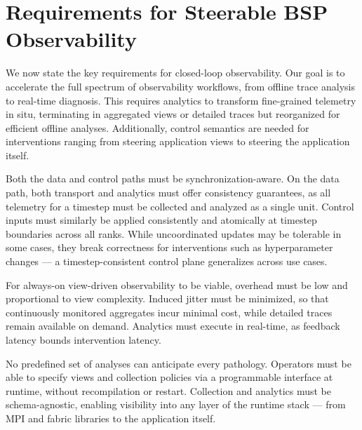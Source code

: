 
\section{Requirements for Steerable BSP Observability}
\label{sec:orca:req}

We now state the key requirements for closed-loop observability.
Our goal is to accelerate the full spectrum of observability workflows, from offline trace analysis
to real-time diagnosis.
This requires analytics to transform fine-grained telemetry in situ, terminating in aggregated
views or detailed traces but reorganized for efficient offline analyses.
Additionally, control semantics are needed for interventions ranging from steering application views to steering the
application itself.

Both the data and control paths must be synchronization-aware.
On the data path, both transport and analytics must offer consistency guarantees, as all telemetry
for a timestep must be collected and analyzed as a single unit.
Control inputs must similarly be applied consistently and atomically at timestep boundaries
across all ranks.
While uncoordinated updates may be tolerable in some cases, they break correctness for
interventions such as hyperparameter changes --- a timestep-consistent control plane generalizes
across use cases.

For always-on view-driven observability to be viable, overhead must be low and proportional to view
complexity.
Induced jitter must be minimized, so that continuously monitored aggregates incur minimal cost,
while detailed traces remain available on demand.
Analytics must execute in real-time, as feedback latency bounds intervention latency.


No predefined set of analyses can anticipate every pathology.
Operators must be able to specify views and collection policies via a programmable interface at
runtime, without recompilation or restart.
Collection and analytics must be schema-agnostic, enabling visibility into any layer of the runtime
stack --- from MPI and fabric libraries to the application itself.

